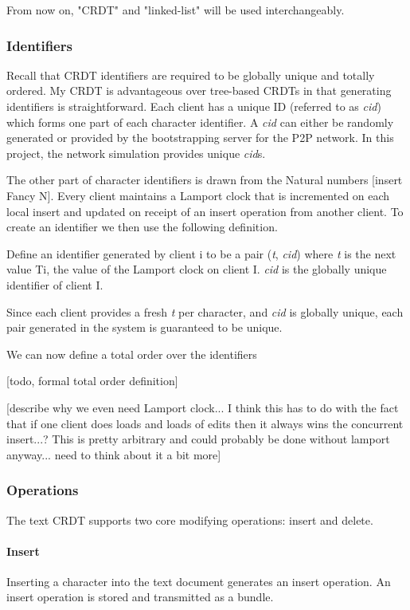 \documentclass[12pt,a4paper,twoside,openright]{report}
\begin{document}
		From now on, "CRDT" and "linked-list" will be used interchangeably.
	
		\subsubsection{Identifiers}
		
		Recall that CRDT identifiers are required to be globally unique and totally ordered. My CRDT is advantageous over tree-based CRDTs in that generating identifiers is straightforward. Each client has a unique ID (referred to as \textit{cid}) which forms one part of each character identifier. A \textit{cid} can either be randomly generated or provided by the bootstrapping server for the P2P network. In this project, the network simulation provides unique \textit{cid}s.
		
		The other part of character identifiers is drawn from the Natural numbers [insert Fancy N]. Every client maintains a Lamport \cite{lamport1978} clock that is incremented on each local insert and updated on receipt of an insert operation from another client. To create an identifier we then use the following definition.
		
		Define an identifier generated by client i to be a pair (\textit{t}, \textit{cid}) where \textit{t} is the next value Ti, the value of the Lamport clock on client I. \textit{cid} is the globally unique identifier of client I.
		
		Since each client provides a fresh \textit{t} per character, and \textit{cid} is globally unique, each pair generated in the system is guaranteed to be unique.
		
		We can now define a total order over the identifiers
		
		[todo, formal total order definition]
		
		[describe why we even need Lamport clock... I think this has to do with the fact that if one client does loads and loads of edits then it always wins the concurrent insert...? This is pretty arbitrary and could probably be done without lamport anyway... need to think about it a bit more]
		
		
		\subsubsection{Operations}
		The text CRDT supports two core modifying operations: insert and delete.
		
			\paragraph{Insert}
				Inserting a character into the text document generates an insert operation. An insert operation is stored and transmitted as a bundle.
				
\end{document}
